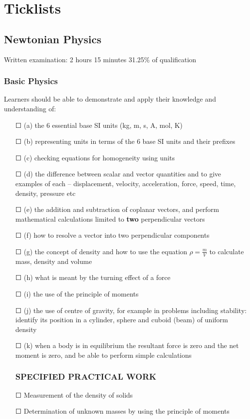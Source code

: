 \chapter{Ticklists}
\section{Newtonian Physics}

Written examination: 2 hours 15 minutes
31.25\% of qualification
\subsection{Basic Physics}
Learners should be able to demonstrate and apply their knowledge and
understanding of:
\begin{itemize}
	\item[\Large{$\Square$}](a) the 6 essential base SI units (\sq kg, \sq m, \sq s, \sq A, \sq mol, \sq K)
	\item[\Large{$\Square$}](b) representing units in terms of the 6 base SI units and their prefixes
	\item[\Large{$\Square$}](c) checking equations for homogeneity using units
	\item[\Large{$\Square$}](d) the difference between scalar and vector quantities and to \sq give examples of each – displacement, velocity, acceleration, force, speed, time, density,
	pressure etc
	\item[\Large{$\Square$}](e) the addition and subtraction of coplanar vectors, and \sq perform mathematical calculations limited to \textbf{two} perpendicular vectors
	\item[\Large{$\Square$}](f) how to resolve a vector into two perpendicular components
	\item[\Large{$\Square$}](g) the concept of density and \sq how to use the equation \(\rho=\frac{m}{V}\) to calculate mass, density and volume
	\item[\Large{$\Square$}](h) what is meant by the turning effect of a force
	\item[\Large{$\Square$}](i) the use of the principle of moments
	\item[\Large{$\Square$}](j) the use of centre of gravity, for example in problems including stability:
	identify its position in a \sq cylinder, \sq sphere and \sq cuboid (beam) of uniform density
	\item[\Large{$\Square$}](k) when a body is in equilibrium the resultant force is zero and the net moment
	is zero, and \sq be able to perform simple calculations
	\subsection*{SPECIFIED PRACTICAL WORK}
	\item[\Large{$\Square$}] Measurement of the density of solids
	\item[\Large{$\Square$}] Determination of unknown masses by using the principle of moments
\end{itemize}

